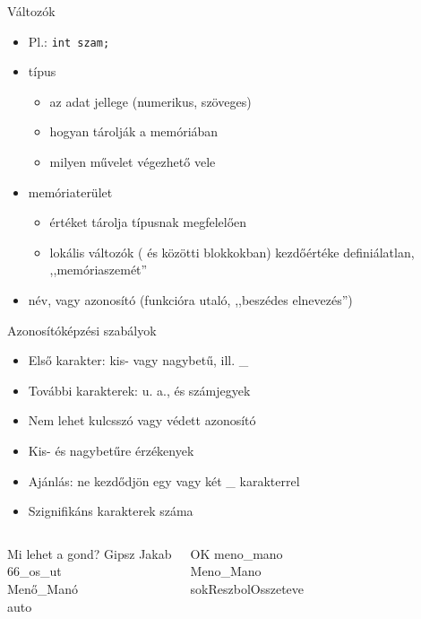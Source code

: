 \documentclass[usenames,dvipsnames,aspectratio=169]{beamer}
\begin{document}
\begin{frame}
  Változók
  \begin{itemize}
    \item Pl.: \texttt{int szam;}
    \item típus
    \begin{itemize}
      \item az adat jellege (numerikus, szöveges)
      \item hogyan tárolják a memóriában
      \item milyen művelet végezhető vele
    \end{itemize}
    \item memóriaterület
    \begin{itemize}
      \item értéket tárolja típusnak megfelelően
      \item lokális változók (\kiemel{\{} és \kiemel{\}} közötti blokkokban) kezdőértéke definiálatlan, ,,memóriaszemét''
    \end{itemize}
    \item név, vagy azonosító (funkcióra utaló, ,,beszédes elnevezés'')
  \end{itemize}
\end{frame}

\begin{frame}
  Azonosítóképzési szabályok
  \begin{itemize}
    \item Első karakter: kis- vagy nagybetű, ill. \_
    \item További karakterek: u. a., és számjegyek
    \item Nem lehet kulcsszó vagy védett azonosító
    \item Kis- és nagybetűre érzékenyek
    \item Ajánlás: ne kezdődjön egy vagy két \_ karakterrel
    \item Szignifikáns karakterek száma
  \end{itemize}
  \begin{columns}[T]
      \begin{alertblock}{Mi lehet a gond?}
        Gipsz Jakab\\
        66\_os\_ut\\
        Menő\_Manó\\
        auto
      \end{alertblock}
      \begin{exampleblock}{OK}
        meno\_mano\\
        Meno\_Mano\\
        sokReszbolOsszeteve
      \end{exampleblock}
  \end{columns}
\end{frame}
\end{document}
